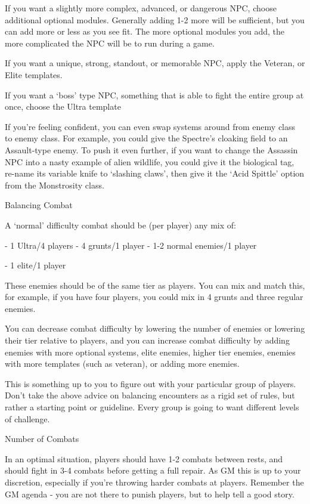 If you want a slightly more complex, advanced, or dangerous NPC, choose additional optional
modules. Generally adding 1-2 more will be sufficient, but you can add more or less as you see
fit. The more optional modules you add, the more complicated the NPC will be to run during a
game.


If you want a unique, strong, standout, or memorable NPC, apply the Veteran, or Elite templates.


If you want a ‘boss’ type NPC, something that is able to fight the entire group at once, choose
the Ultra template


If you’re feeling confident, you can even swap systems around from enemy class to enemy class.
For example, you could give the Spectre’s cloaking field to an Assault-type enemy. To push it
even further, if you want to change the Assassin NPC into a nasty example of alien wildlife, you
could give it the biological tag, re-name its variable knife to ‘slashing claws’, then give it the ‘Acid
Spittle’ option from the Monstrosity class.


                                            Balancing Combat


A ‘normal’ difficulty combat should be (per player) any mix of:

    -   1 Ultra/4 players
    -   4 grunts/1 player
    -   1-2 normal enemies/1 player

    -   1 elite/1 player

These enemies should be of the same tier as players. You can mix and match this, for example, if
you have four players, you could mix in 4 grunts and three regular enemies.


You can decrease combat difficulty by lowering the number of enemies or lowering their tier
relative to players, and you can increase combat difficulty by adding enemies with more optional
systems, elite enemies, higher tier enemies, enemies with more templates (such as veteran), or
adding more enemies.





This is something up to you to figure out with your particular group of players. Don’t take the
above advice on balancing encounters as a rigid set of rules, but rather a starting point or
guideline. Every group is going to want different levels of challenge.


                                          Number of Combats

In an optimal situation, players should have 1-2 combats between rests, and should fight in 3-4
combats before getting a full repair. As GM this is up to your discretion, especially if you’re
throwing harder combats at players. Remember the GM agenda - you are not there to punish
players, but to help tell a good story.

